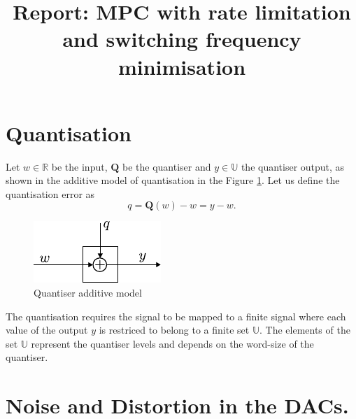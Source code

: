 \documentclass[a4paper]{article}
\title{Report: MPC with rate limitation and switching frequency minimisation}
\begin{document}
\newpage
\maketitle

\section{Quantisation}
Let $w \in \mathbb{R}$ be the input, $\mathbf{Q}$ be the quantiser and $y \in \mathbb{U}$ the quantiser output, as shown in the additive model of quantisation in the Figure \ref{fig:quan_add_model}.  Let us define the quantisation error as 
\begin{equation}
	q = \mathbf{Q}(w) - w= y -w.
	\label{eq:error}
\end{equation}
\begin{figure}[!htb]
    \centering
    \includegraphics[scale = 1]{figures/quantizer_additive_model.pdf}
    \caption{Quantiser additive model}
    \label{fig:quan_add_model}
\end{figure}
The quantisation requires the signal to be mapped to a finite signal where each value of the output $y$ is restriced to belong to a finite set $\mathbb{U}$. The elements of the set $\mathbb{U}$ represent the quantiser levels and depends on the word-size of the quantiser. 

\section{Noise and Distortion in the DACs.}
\end{document}

